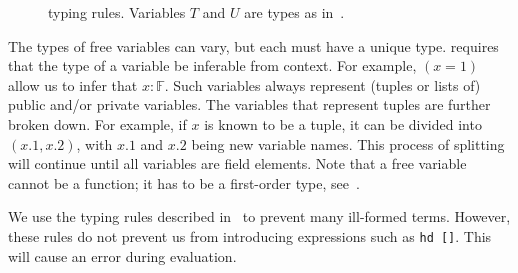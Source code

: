 \documentclass[
    9pt,            
    techreport,       
    affiltop,       
]{art}
\begin{document}
\begin{figure}[H]
\centering
\begin{spacing}{1.5}
\caption{\VampIR{} typing rules. 
Variables $T$ and $U$ are types as in~.
}
\label{fig:typing-rules-1}
\end{spacing}
\end{figure}


The types of free variables can vary, but each must have a unique type. \VampIR{} requires that the type of a variable be inferable from context. For example, $(x = 1)$ allow us to infer that $x : \mathbb{F}$. Such variables always represent (tuples or lists of) public and/or private variables. The variables that represent tuples are further broken down. For example, if $x$ is known to be a tuple, it can be divided into $(x.1, x.2)$, with $x.1$ and $x.2$ being new variable names. This process of splitting will continue until all variables are field elements. Note that a free variable cannot be a function; it has to be a first-order type, see~.

\begin{remark}
We use the typing rules described in~ to prevent many ill-formed terms. However, these rules do not prevent us from introducing expressions such as \texttt{hd  []}. This will cause an error during evaluation.
\end{remark}
\end{document}
